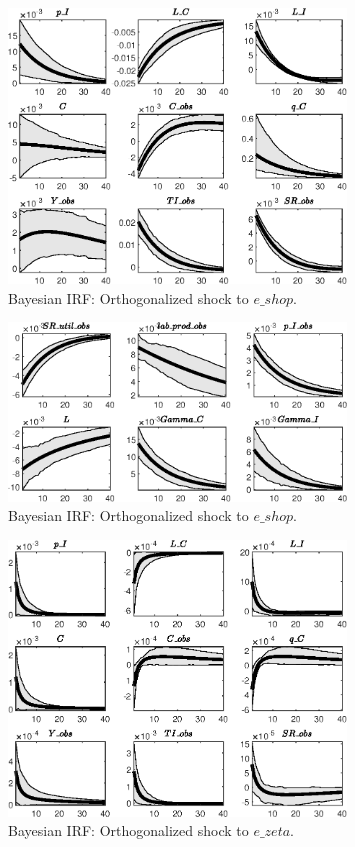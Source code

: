 \begin{figure}[H]
\centering 
\includegraphics[width=0.80\textwidth]{directed_search/Output/directed_search_Bayesian_IRF_e_shop_1}
\caption{Bayesian IRF: Orthogonalized shock to $e\_shop$.}
\label{Fig:BayesianIRF:e_shop:1}
\end{figure}
 
\begin{figure}[H]
\centering 
\includegraphics[width=0.80\textwidth]{directed_search/Output/directed_search_Bayesian_IRF_e_shop_2}
\caption{Bayesian IRF: Orthogonalized shock to $e\_shop$.}
\label{Fig:BayesianIRF:e_shop:2}
\end{figure}
 
\begin{figure}[H]
\centering 
\includegraphics[width=0.80\textwidth]{directed_search/Output/directed_search_Bayesian_IRF_e_zeta_1}
\caption{Bayesian IRF: Orthogonalized shock to $e\_zeta$.}
\label{Fig:BayesianIRF:e_zeta:1}
\end{figure}
 
